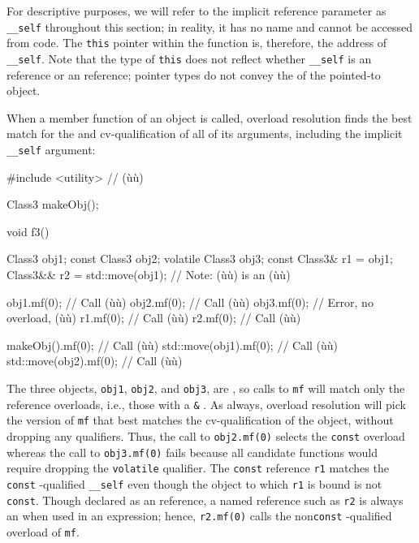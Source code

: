 \noindent For descriptive purposes, we will refer to the implicit reference
parameter as \lstinline!__self! throughout this section; in reality, it
has no name and cannot be accessed from code. The \lstinline!this! pointer
within the function is, therefore, the address of \lstinline!__self!.
Note that the type of \lstinline!this! does not reflect whether
\lstinline!__self! is an  reference or an 
reference; pointer types do not convey the  of
the pointed-to object.

When a member function of an object is called, overload resolution finds
the best match for the  and cv-qualification of
all of its arguments, including the implicit \lstinline!__self! argument:

\begin{emcppslisting}[emcppsbatch=e1]
#include <utility>  // (ù{}ù)

Class3 makeObj();

void f3()
{
    Class3          obj1;
    const Class3    obj2;
    volatile Class3 obj3;
    const Class3&   r1 = obj1;
    Class3&&        r2 = std::move(obj1);  // Note: (ù{}ù) is an (ù{}ù)

    obj1.mf(0);  // Call (ù{}ù)
    obj2.mf(0);  // Call (ù{}ù)
    obj3.mf(0);  // Error, no overload, (ù{}ù)
    r1.mf(0);    // Call (ù{}ù)
    r2.mf(0);    // Call (ù{}ù)

    makeObj().mf(0);        // Call (ù{}ù)
    std::move(obj1).mf(0);  // Call (ù{}ù)
    std::move(obj2).mf(0);  // Call (ù{}ù)
}
\end{emcppslisting}
    

\noindent The three objects, \lstinline!obj1!, \lstinline!obj2!, and \lstinline!obj3!, are
, so calls to \lstinline!mf! will match only the
 reference overloads, i.e., those with a \lstinline!&!
. As always, overload resolution will pick the
version of \lstinline!mf! that best matches the cv-qualification of the
object, without dropping any qualifiers. Thus, the call to
\lstinline!obj2.mf(0)! selects the \lstinline!const! overload whereas the call
to \lstinline!obj3.mf(0)! fails because all candidate functions would
require dropping the \lstinline!volatile! qualifier. The \lstinline!const!
 reference \lstinline!r1! matches the \lstinline!const!
-qualified \lstinline!__self! even though the object to
which \lstinline!r1! is bound is not \lstinline!const!. Though declared as an
 reference, a named reference such as \lstinline!r2! is always
an  when used in an expression; hence, \lstinline!r2.mf(0)!
calls the non\lstinline!const! -qualified overload of
\lstinline!mf!.

